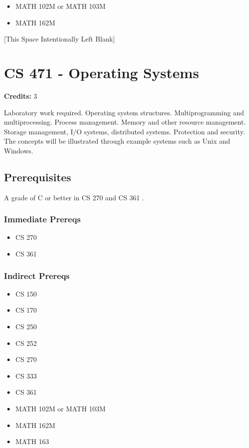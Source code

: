 \documentclass[]{article}
\providecommand{\tightlist}{%
  \setlength{\itemsep}{0pt}\setlength{\parskip}{0pt}}
\newcommand{\pagebreakhere}{
\vspace*{\fill}
\begin{center}
[This Space Intentionally Left Blank]
\end{center}
\vspace*{\fill}
\newpage
}
\begin{document}
\begin{itemize}
\tightlist
\item
  MATH 102M or MATH 103M
\item
  MATH 162M
\end{itemize}

\pagebreakhere
\section{CS 471 - Operating Systems}\label{cs-471---operating-systems}

\textbf{Credits:} 3

Laboratory work required. Operating system structures. Multiprogramming
and multiprocessing. Process management. Memory and other resource
management. Storage management, I/O systems, distributed systems.
Protection and security. The concepts will be illustrated through
example systems such as Unix and Windows.

\subsection{Prerequisites}\label{prerequisites-43}

A grade of C or better in CS 270 and CS 361 .

\subsubsection{Immediate Prereqs}\label{immediate-prereqs-34}

\begin{itemize}
\tightlist
\item
  CS 270
\item
  CS 361
\end{itemize}

\subsubsection{Indirect Prereqs}\label{indirect-prereqs-34}

\begin{itemize}
\tightlist
\item
  CS 150
\item
  CS 170
\item
  CS 250
\item
  CS 252
\item
  CS 270
\item
  CS 333
\item
  CS 361
\item
  MATH 102M or MATH 103M
\item
  MATH 162M
\item
  MATH 163
\end{itemize}
\end{document}
